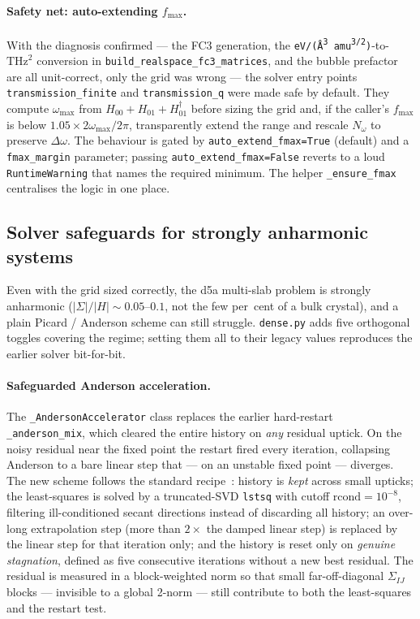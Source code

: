 \paragraph{Safety net: auto-extending $f_{\max}$.}
With the diagnosis confirmed --- the FC3 generation, the
\texttt{eV/(\AA{}\textsuperscript{3}\,amu\textsuperscript{3/2})}-to-$\mathrm{THz}^{2}$
conversion in \texttt{build\_realspace\_fc3\_matrices}, and the bubble
prefactor are all unit-correct, only the grid was wrong --- the
solver entry points \texttt{transmission\_finite} and
\texttt{transmission\_q} were made safe by default. They compute
$\omega_{\max}$ from $H_{00}+H_{01}+H_{01}^{\dagger}$ before sizing the
grid and, if the caller's $f_{\max}$ is below $1.05\times
2\omega_{\max}/2\pi$, transparently extend the range and rescale
$N_\omega$ to preserve $\Delta\omega$. The behaviour is gated by
\texttt{auto\_extend\_fmax=True} (default) and a \texttt{fmax\_margin}
parameter; passing \texttt{auto\_extend\_fmax=False} reverts to a loud
\texttt{RuntimeWarning} that names the required minimum. The helper
\texttt{\_ensure\_fmax} centralises the logic in one place.

\subsection{Solver safeguards for strongly anharmonic systems}
\label{ssec:solver_safeguards}

Even with the grid sized correctly, the d5a multi-slab problem is
strongly anharmonic ($|\Sigma|/|H|\sim 0.05$--$0.1$, not the few
per~cent of a bulk crystal), and a plain Picard / Anderson scheme can
still struggle. \texttt{dense.py} adds five orthogonal toggles
covering the regime; setting them all to their legacy values
reproduces the earlier solver bit-for-bit.

\paragraph{Safeguarded Anderson acceleration.}
The \texttt{\_AndersonAccelerator} class replaces the earlier
hard-restart \texttt{\_anderson\_mix}, which cleared the entire history
on \emph{any} residual uptick. On the noisy residual near the
fixed point the restart fired every iteration, collapsing Anderson to
a bare linear step that --- on an unstable fixed point --- diverges.
The new scheme follows the standard
recipe~\cite{walker_anderson_2011,toth_convergence_2015}: history is
\emph{kept} across small upticks; the least-squares is solved by a
truncated-SVD \texttt{lstsq} with cutoff $\mathrm{rcond}=10^{-8}$,
filtering ill-conditioned secant directions instead of discarding all
history; an over-long extrapolation step (more than $2\times$ the
damped linear step) is replaced by the linear step for that iteration
only; and the history is reset only on \emph{genuine stagnation},
defined as five consecutive iterations without a new best residual.
The residual is measured in a block-weighted norm so that small
far-off-diagonal $\Sigma_{IJ}$ blocks --- invisible to a global 2-norm
--- still contribute to both the least-squares and the restart test.

